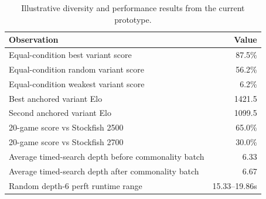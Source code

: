 \begin{table}[t]
\centering
\caption{Illustrative diversity and performance results from the current prototype.}
\label{tab:benchmark-summary}
\small
\begin{tabular}{@{}lr@{}}
\toprule
\textbf{Observation} & \textbf{Value} \\
\midrule
Equal-condition best variant score & 87.5\% \\
Equal-condition random variant score & 56.2\% \\
Equal-condition weakest variant score & 6.2\% \\
Best anchored variant Elo & 1421.5 \\
Second anchored variant Elo & 1099.5 \\
20-game score vs Stockfish 2500 & 65.0\% \\
20-game score vs Stockfish 2700 & 30.0\% \\
Average timed-search depth before commonality batch & 6.33 \\
Average timed-search depth after commonality batch & 6.67 \\
Random depth-6 perft runtime range & 15.33--19.86s \\
\bottomrule
\end{tabular}
\end{table}
